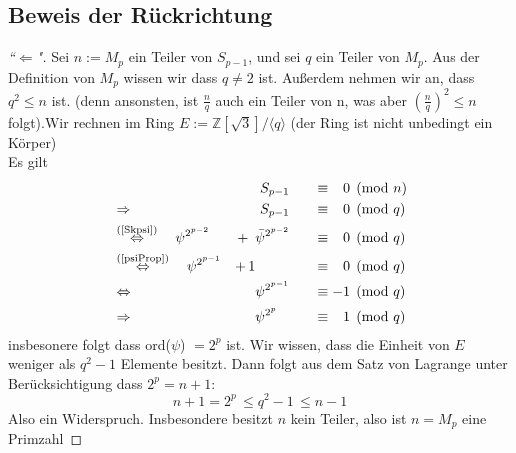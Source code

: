 \documentclass{article}
\newcommand{\Integer}{\ensuremath{\mathbb{Z}}}
\begin{document}
\subsection{Beweis der R\"{u}ckrichtung}
\begin{proof}[``$\Leftarrow$"]
Sei $n := M_p$ ein Teiler von $S_{p-1}$, und sei $q$ ein Teiler von $M_p$.
Aus der Definition von $M_p$ wissen wir dass $q\neq2$ ist. Au\ss erdem nehmen wir an, dass $q^2 \leq n$ ist. (denn ansonsten, ist $\frac{n}{q}$ auch ein Teiler von n, was aber $(\frac{n}{q})^2 \leq n$ folgt).Wir rechnen im Ring $E  := \Integer[\sqrt{3}]/\langle q \rangle$ (der Ring ist nicht unbedingt ein K\"{o}rper)\\
Es gilt %
\begin{alignat*}{4}
	&\phantom{\Rightarrow a} & S_{p-1} \quad &&\equiv{\phantom{-}0} &\pmod{n} \\
	&\Rightarrow &S_{p-1} 		\quad   &&\equiv{\phantom{-}0} &\pmod{q}\\
	&\overset{\text{(\ref{Skpsi})}}{\Leftrightarrow} \quad \psi^{2^{p-2}} &+ \phantom{1}\bar{\psi}^{2^{p-2}} \quad &&\equiv{\phantom{-}0} &\pmod{q}\\
	&\overset{\text{(\ref{psiProp})}}{\Leftrightarrow} \quad \psi^{2^{p-1}} &+ \,1 \phantom{\bar{\psi}^{2^{p-2}}} \quad &&\equiv{\phantom{-}0}  &\pmod{q}\\
	&\Leftrightarrow &\psi^{2^{p-1}} \quad &&\equiv{-1} &\pmod{q}\\
	&\Rightarrow &\psi^{2^{p\phantom{-1}}} \quad && \equiv{\phantom{-}1} &\pmod{q}
\end{alignat*}
insbesonere folgt dass ord($\psi$) $ = 2^p$ ist. Wir wissen, dass die Einheit von $E$ weniger als $q^2 - 1$ Elemente besitzt. Dann folgt aus dem Satz von Lagrange unter Ber\"{u}cksichtigung dass $2^{p} = n + 1$:
\[
	n + 1 = 2^{p} \,\leq q^2-1 \,\leq n - 1
\]
Also ein Widerspruch. Insbesondere besitzt $n$ kein Teiler, also ist $n = M_p$ eine Primzahl
\end{proof}
\end{document}
